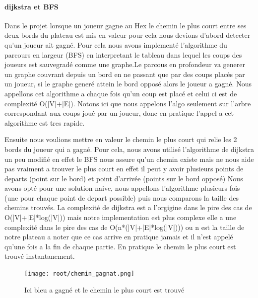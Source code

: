 \paragraph{dijkstra et BFS}
Dans le projet lorsque un joueur gagne au Hex le chemin le plus court entre ses deux bords du plateau est mis en valeur
pour cela nous devions d'abord detecter qu'un joueur ait gagné. Pour cela nous avons implementé l'algorithme du parcours
en largeur (BFS) en interpretant le tableau dans lequel les coups des joueurs est sauvegradé comme une graphe.Le parcous en profondeur
va generer un graphe couvrant depuis un bord en ne passant que par des coups placés par un joueur, si le graphe generé attein le bord opposé
alors le joueur a gagné. Nous appellons cet algorithme a chaque fois qu'un coup est placé et celui ci est de complexité O(|V|+|E|).
Notons ici que nous appelons l'algo seulement sur l'arbre correspondant aux coups joué par un joueur, donc en pratique l'appel a cet algorithme
est tres rapide.

Ensuite nous voulions mettre en valeur le chemin le plus court qui relie les 2 bords du joueur qui a gagné. Pour cela,
nous avons utilisé l'algorithme de dijkstra un peu modifié en effet le BFS nous assure qu'un chemin existe mais ne nous aide pas vraiment
a trouver le plus court en effet il peut y avoir plusieurs points de departs (point sur le bord) et point d'arrivée (points sur le bord opposé)
Nous avons opté pour une solution naive, nous appellons l'algorithme plusieurs fois (une pour chaque point de depart possible)
puis nous comparons la taille des chemins trouvés. La complexité de dijkstra est a l'orgigine dans le pire des cas de O(|V|+|E|*log(|V|)) 
mais notre implementation est plus complexe elle a une complexité dans le pire des cas de O(n*(|V|+|E|*log(|V|))) ou n est la taille de notre plateau
a noter que ce cas arrive en pratique jamais et il n'est appelé qu'une fois a la fin de chaque partie. En pratique le chemin le plus court est trouvé
instantanement.

\begin{figure}[h]
    \begin{center}
        \texttt{[image: root/chemin\_gagnat.png]}
    \end{center}
    \caption{Ici bleu a gagné et le chemin le plus court est trouvé}\label{fig:chemin_gagnant}
\end{figure}